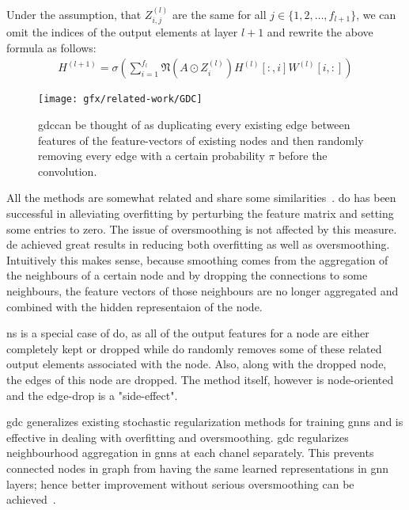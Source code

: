 Under the assumption, that $Z_{i,j}^{(l)}$ are the same for all $j \in \{1,2,\dots, f_{l+1}\}$,
we can omit the indices of the output elements at layer $l+1$ and rewrite the above formula as follows:
\begin{align*}
    H^{(l+1)} = \sigma(\sum_{i= 1}^{f_{l}}\mathfrak{N}(A \odot Z_{i}^{(l)})H^{(l)}[:,i] W^{(l)}[i,:])
\end{align*}
\begin{figure}[H]
    \centering
    \texttt{[image: gfx/related-work/GDC]}
    \caption{\acf{gdc}can be thought of as duplicating every existing edge between features of the feature-vectors of existing nodes and then randomly removing every edge with a certain probability $\pi$ before the convolution.}\label{fig:related:GraphDropConnect}
\end{figure}

All the methods are somewhat related and share some similarities~\cite{Rong2020}. \acf{do} has been successful in alleviating overfitting by perturbing the feature matrix and setting some entries to zero. The issue of oversmoothing is not affected by this measure.
\acf{de} achieved great results in reducing both overfitting as well as oversmoothing. Intuitively this makes sense, because smoothing comes from the aggregation of the neighbours of a certain node and by dropping the connections to some neighbours, the feature vectors of those neighbours are no longer aggregated and combined with the hidden representaion of the node.

\acf{ns} is a special case of \acf{do}, as all of the output features for a node are either completely kept or dropped while \ac{do} randomly removes some of these related output elements associated with the node. Also, along with the dropped node, the edges of this node are dropped. The method itself, however is node-oriented and the edge-drop is a "side-effect".

\acf{gdc} generalizes existing stochastic regularization methods for training \acp{gnn} and is effective in dealing with overfitting and oversmoothing.
\ac{gdc} regularizes neighbourhood aggregation in \acp{gnn} at each chanel separately. This prevents connected nodes in graph from having the same learned representations in \ac{gnn} layers; hence better improvement without serious oversmoothing can be achieved~\cite{Hasanzadeh2020}.



